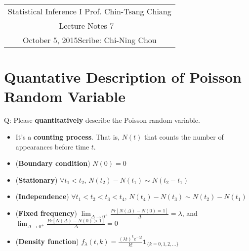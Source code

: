 \documentclass[11pt]{article}
\newcommand{\scribe}{Chi-Ning Chou}
\newcommand{\lecnum}{7}
\newcommand{\lecdate}{October 5, 2015}
\begin{document}
	
	\begin{center}
		\renewcommand{\arraystretch}{2}
		\begin{bfseries}
			\begin{tabular}{|c|}
				\hline
				Statistical Inference I \hfill Prof. Chin-Tsang Chiang\\
				\hspace{15em} {\large Lecture Notes \lecnum} \hspace{15em}\ \\
				\lecdate \hfill Scribe: \scribe\\
				\hline
			\end{tabular}
			\renewcommand{\arraystretch}{1}
		\end{bfseries}
	\end{center}
	

\section{Quantative Description of Poisson Random Variable}
Q: Please {\bf quantitatively} describe the Poisson random variable.
\begin{itemize}
	\item It's a {\bf counting process}. That is, $N(t)$ that counts the number of appearances before time $t$.
	\item ({\bf Boundary condition}) $N(0)=0$
	\item ({\bf Stationary}) $\forall t_1<t_2$, $N(t_2)-N(t_1)\sim N(t_2-t_1)$
	\item ({\bf Independence}) $\forall t_1<t_2<t_3<t_4$, $N(t_4)-N(t_3)\sim N(t_2)-N(t_1)$
	\item ({\bf Fixed frequency}) $\lim_{\Delta\rightarrow0^+} \frac{Pr[N(\Delta)-N(0) = 1]}{\Delta}=\lambda$, and $\lim_{\Delta\rightarrow0^+} \frac{Pr[N(\Delta)-N(0) > 1]}{\Delta}=0$
	\item ({\bf Density function}) $f_{\lambda}(t,k) = \frac{(\lambda t)^{k}e^{-\lambda t}}{k!}\mathbf{1}_{\{k=0,1,2,...\}}$
\end{itemize}
\end{document}
